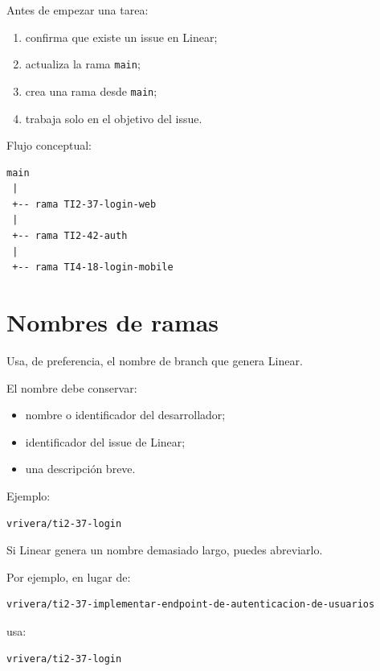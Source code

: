 \documentclass[11pt,a4paper]{article}
\begin{document}
Antes de empezar una tarea:

\begin{enumerate}
  \item confirma que existe un issue en Linear;
  \item actualiza la rama \texttt{main};
  \item crea una rama desde \texttt{main};
  \item trabaja solo en el objetivo del issue.
\end{enumerate}

Flujo conceptual:

\begin{lstlisting}
main
 |
 +-- rama TI2-37-login-web
 |
 +-- rama TI2-42-auth
 |
 +-- rama TI4-18-login-mobile
\end{lstlisting}


\section{Nombres de ramas}

Usa, de preferencia, el nombre de branch que genera Linear.

El nombre debe conservar:

\begin{itemize}
  \item nombre o identificador del desarrollador;
  \item identificador del issue de Linear;
  \item una descripción breve.
\end{itemize}

Ejemplo:

\begin{lstlisting}
vrivera/ti2-37-login
\end{lstlisting}

Si Linear genera un nombre demasiado largo, puedes abreviarlo.

Por ejemplo, en lugar de:

\begin{lstlisting}
vrivera/ti2-37-implementar-endpoint-de-autenticacion-de-usuarios
\end{lstlisting}

usa:

\begin{lstlisting}
vrivera/ti2-37-login
\end{lstlisting}
\end{document}

